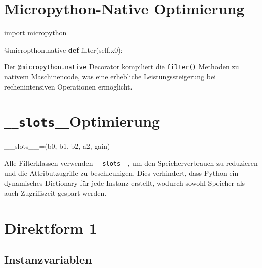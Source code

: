 \documentclass[
  ngerman,
  letterpaper,
  DIV=11]{scrreprt}
\newenvironment{Shaded}{\begin{snugshade}}{\end{snugshade}}
\newcommand{\AttributeTok}[1]{\textcolor[rgb]{0.40,0.45,0.13}{#1}}
\newcommand{\BuiltInTok}[1]{\textcolor[rgb]{0.00,0.23,0.31}{#1}}
\newcommand{\ImportTok}[1]{\textcolor[rgb]{0.00,0.46,0.62}{#1}}
\newcommand{\KeywordTok}[1]{\textcolor[rgb]{0.00,0.23,0.31}{\textbf{#1}}}
\newcommand{\NormalTok}[1]{\textcolor[rgb]{0.00,0.23,0.31}{#1}}
\newcommand{\OperatorTok}[1]{\textcolor[rgb]{0.37,0.37,0.37}{#1}}
\newcommand{\StringTok}[1]{\textcolor[rgb]{0.13,0.47,0.30}{#1}}
\newcommand{\VariableTok}[1]{\textcolor[rgb]{0.07,0.07,0.07}{#1}}
\begin{document}
\section{Micropython-Native
Optimierung}\label{micropython-native-optimierung}

\begin{Shaded}
\begin{Highlighting}[]
\ImportTok{import}\NormalTok{ micropython}

\AttributeTok{@micropthon.native}
\KeywordTok{def} \BuiltInTok{filter}\NormalTok{(}\VariableTok{self}\NormalTok{,x0):}
\end{Highlighting}
\end{Shaded}

Der \texttt{@micropython.native} Decorator kompiliert die
\texttt{filter()} Methoden zu nativem Maschinencode, was eine erhebliche
Leistungssteigerung bei rechenintensiven Operationen ermöglicht.

\section{\texorpdfstring{\texttt{\_\_slots\_\_}Optimierung}{\_\_slots\_\_Optimierung}}\label{slots__optimierung}

\begin{Shaded}
\begin{Highlighting}[]
\VariableTok{\_\_slots\_\_}\OperatorTok{=}\NormalTok{(}\StringTok{\textquotesingle{}b0\textquotesingle{}}\NormalTok{, }\StringTok{\textquotesingle{}b1\textquotesingle{}}\NormalTok{, }\StringTok{\textquotesingle{}b2\textquotesingle{}}\NormalTok{, }\StringTok{\textquotesingle{}a2\textquotesingle{}}\NormalTok{, }\StringTok{\textquotesingle{}gain\textquotesingle{}}\NormalTok{)\textasciigrave{}}
\end{Highlighting}
\end{Shaded}

Alle Filterklassen verwenden \texttt{\_\_slots\_\_}, um den
Speicherverbrauch zu reduzieren und die Attributzugriffe zu
beschleunigen. Dies verhindert, dass Python ein dynamisches Dictionary
für jede Instanz erstellt, wodurch sowohl Speicher als auch Zugriffszeit
gespart werden.

\section{Direktform 1}\label{direktform-1-2}

\subsection{Instanzvariablen}\label{instanzvariablen}
\end{document}
